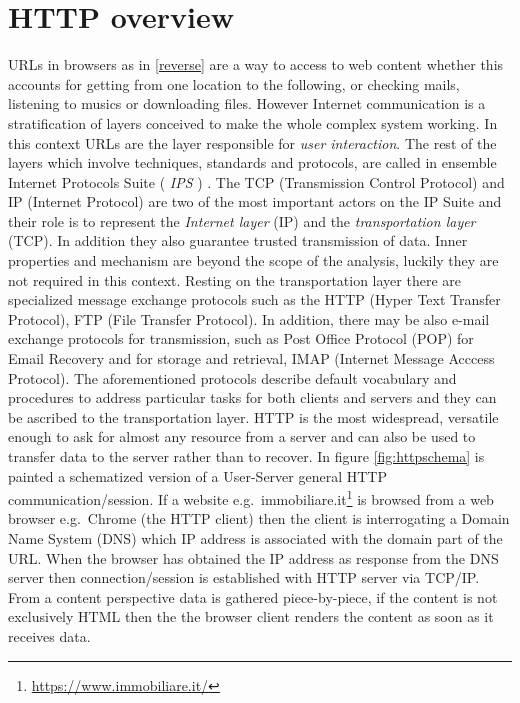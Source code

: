 \documentclass[
  12pt,
  a4paper,
  oneside]{book}
\DeclareRobustCommand{\href}[2]{#2\footnote{\url{#1}}}
\theoremstyle{definition}
\theoremstyle{definition}
\theoremstyle{definition}
\theoremstyle{remark}
\begin{document}
\hypertarget{HTTPmethod}{%
\section{HTTP overview}\label{HTTPmethod}}

URLs in browsers as in \ref{reverse} are a way to access to web content whether this accounts for getting from one location to the following, or checking mails, listening to musics or downloading files. However Internet communication is a stratification of layers conceived to make the whole complex system working. In this context URLs are the layer responsible for \emph{user interaction}. The rest of the layers which involve techniques, standards and protocols, are called in ensemble Internet Protocols Suite ( \emph{IPS} ) \citeyearpar{automateddatacollection}. The TCP (Transmission Control Protocol) and IP (Internet Protocol) are two of the most important actors on the IP Suite and their role is to represent the \emph{Internet layer} (IP) and the \emph{transportation layer} (TCP). In addition they also guarantee trusted transmission of data. Inner properties and mechanism are beyond the scope of the analysis, luckily they are not required in this context. Resting on the transportation layer there are specialized message exchange protocols such as the HTTP (Hyper Text Transfer Protocol), FTP (File Transfer Protocol). In addition, there may be also e-mail exchange protocols for transmission, such as Post Office Protocol (POP) for Email Recovery and for storage and retrieval, IMAP (Internet Message Acccess Protocol). The aforementioned protocols describe default vocabulary and procedures to address particular tasks for both clients and servers and they can be ascribed to the transportation layer. HTTP is the most widespread, versatile enough to ask for almost any resource from a server and can also be used to transfer data to the server rather than to recover. In figure \ref{fig:httpschema} is painted a schematized version of a User-Server general HTTP communication/session. If a website e.g.~\href{https://www.immobiliare.it/}{immobiliare.it} is browsed from a web browser e.g.~Chrome (the HTTP client) then the client is interrogating a Domain Name System (DNS) which IP address is associated with the domain part of the URL. When the browser has obtained the IP address as response from the DNS server then connection/session is established with HTTP server via TCP/IP. From a content perspective data is gathered piece-by-piece, if the content is not exclusively HTML then the the browser client renders the content as soon as it receives data.
\end{document}
